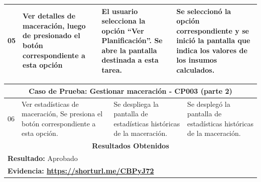 \begin{minipage}{0.95\textwidth}
\begin{center}
\begin{tabularx}{\textwidth}{ | p{2cm} | X | X | X |}
        \hline
        05 & Ver detalles de maceración, luego de presionado el botón correspondiente a esta opción & El usuario selecciona la opción ``Ver Planificación''. Se abre la pantalla destinada a esta tarea.& Se seleccionó la opción correspondiente y se inició la pantalla que indica los valores de los insumos calculados.\\
        \hline
        \end{tabularx}
        \label{CP003-p1}
        \end{center}
        \end{minipage}
        
        \begin{minipage}{0.95\textwidth}
        \begin{center}
        \begin{tabularx}{\textwidth}{ | p{2cm} | X | X | X |}
        \hline
        \multicolumn{4}{|c|}{\textbf{Caso de Prueba: Gestionar maceración - CP003 (parte 2)}} \\
        \hline
        06 & Ver estadísticas de maceración, Se presiona el botón correspondiente a esta opción. & Se despliega la pantalla de estadísticas históricas de  la maceración.& Se desplegó la pantalla de estadísticas históricas de  la maceración.\\
        \hline
        \multicolumn{4}{|c|}{\textbf{Resultados Obtenidos}} \\
        \hline
        \multicolumn{4}{|l|}{\textbf{Resultado:} Aprobado} \\
        \hline
        \multicolumn{4}{|l|}{\textbf{Evidencia: \url{https://shorturl.me/CBPyJ72}}} \\
        \hline
     \end{tabularx}
    \label{CP003-p2}
    \end{center}
    \end{minipage}
    
